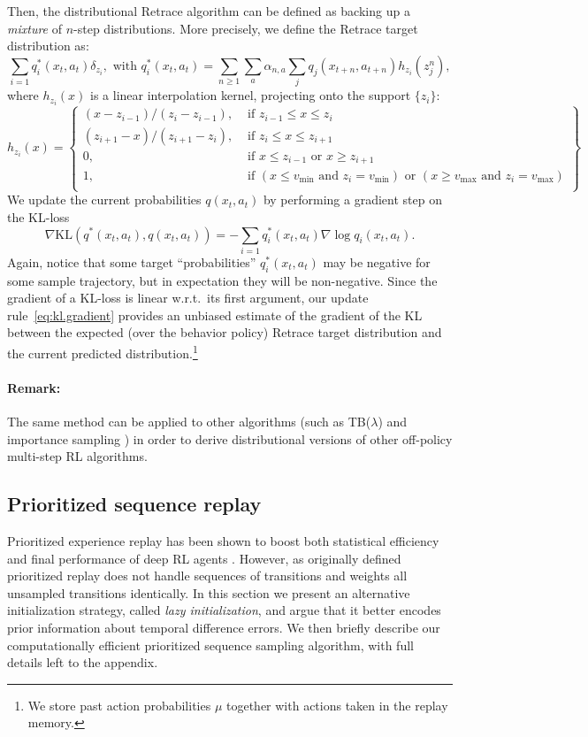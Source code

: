 \documentclass{article}
\newcommand{\beq}{\begin{equation}}
\newcommand{\eeq}{\end{equation}}
\begin{document}
Then, the distributional Retrace algorithm can be defined as backing up a {\em 
mixture} of $n$-step distributions. More precisely, 
we define the Retrace target distribution as:
$$\sum_{i=1} q^{*}_i(x_t,a_t) \delta_{z_i}, \mbox{ with } q^{*}_i(x_t,a_t) = 
\sum_{n\geq 1}\sum_a \alpha_{n,a} \sum_{j} q_j(x_{t+n},a_{t+n}) h_{z_i}(z^{n}_j),$$
where $h_{z_i}(x)$ is a linear interpolation kernel, projecting onto the support $\{ z_i \}$: 
$$h_{z_i}(x) = \left\{
  \begin{array}{lr}
   (x - z_{i-1}) / (z_{i} - z_{i-1}), & \text{ if } z_{i-1} \leq x \leq z_{i}\\
   (z_{i+1} - x) / (z_{i+1} - z_{i}), & \text{ if } z_{i} \leq x \leq z_{i+1}\\
    0, & \text{ if } x\leq z_{i-1} \text{ or } x \geq z_{i+1}\\
    1, & \text{ if } (x\leq v_{\min} \text{ and } z_i = v_{\min}) \text{ or } 
                    (x\geq v_{\max} \text{ and } z_i = v_{\max})\\
  \end{array}\right\}$$
We update the current 
probabilities $q(x_t, a_t)$ by performing a gradient step on the KL-loss 
\beq\label{eq:kl.gradient}
\nabla \mbox{KL}(q^{*}(x_t,a_t), q(x_t,a_t)) = -\sum_{i=1} 
q^{*}_i(x_t,a_t)\nabla 
\log q_i(x_t,a_t).
\eeq
Again, notice that some target ``probabilities'' $q^{*}_i(x_t,a_t)$ may be negative 
for some sample trajectory, but in expectation they will be non-negative. 
Since the gradient of a KL-loss is linear w.r.t.~its first argument, our update 
rule~\eqref{eq:kl.gradient} provides an unbiased estimate of the gradient of the 
KL between the expected (over the behavior policy) Retrace target distribution 
and the current predicted distribution.\footnote{We store past action probabilities $\mu$ together with actions taken in the replay memory.}

\paragraph{Remark:} The same method can be applied to other algorithms (such as 
TB($\lambda$) \citep{precup2000eligibility} and importance sampling 
\citep{precup01offpolicy}) in order to derive distributional versions of other
off-policy multi-step RL algorithms.  

\subsection{Prioritized sequence replay}\label{sec:prioritized_seq}
Prioritized experience replay has been shown to boost both statistical 
efficiency and final performance of deep RL agents 
\citep{schaul16prioritized}. However, as originally defined prioritized replay 
does not handle sequences of transitions and weights all unsampled transitions 
identically. In this section we present an alternative initialization strategy, 
called \textit{lazy initialization}, 
and argue that it better encodes prior information about temporal difference 
errors. We then briefly describe our computationally efficient prioritized sequence 
sampling algorithm, 
with full details left to the appendix.
\end{document}
